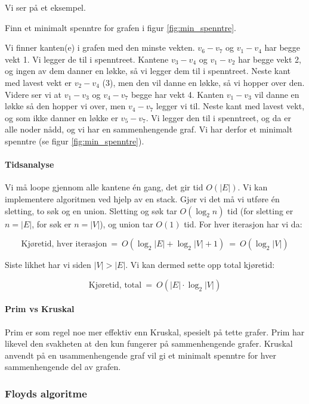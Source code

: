 \noindent Vi ser på et eksempel.

\begin{example} Finn et minimalt spenntre for grafen i figur \ref{fig:min_spenntre}.

Vi finner kanten(e) i grafen med den minste vekten. $ v_6-v_7 $ og $ v_1-v_4 $ har begge vekt 1. Vi legger de til i spenntreet. Kantene $ v_3-v_4 $ og $ v_1-v_2 $ har begge vekt 2, og ingen av dem danner en løkke, så vi legger dem til i spenntreet. Neste kant med lavest vekt er $ v_2-v_4 $ (3), men den vil danne en løkke, så vi hopper over den. Videre ser vi at $ v_1-v_3 $ og $ v_4-v_7 $ begge har vekt 4. Kanten $ v_1-v_3 $ vil danne en løkke så den hopper vi over, men $ v_4-v_7 $ legger vi til. Neste kant med lavest vekt, og som ikke danner en løkke er $ v_5-v_7 $. Vi legger den til i spenntreet, og da er alle noder nådd, og vi har en sammenhengende graf. Vi har derfor et minimalt spenntre (se figur \ref{fig:min_spenntre}). 
\end{example}


\paragraph{Tidsanalyse}
Vi må loope gjennom alle kantene én gang, det gir tid $ O(|E|) $. Vi kan implementere algoritmen ved hjelp av en stack. Gjør vi det må vi utføre én sletting, to søk og en union. Sletting og søk tar $ O(\log_2 n) $ tid (for sletting er $ n = |E| $, for søk er $ n = |V| $), og union tar $ O(1) $ tid. For hver iterasjon har vi da:

\[ \text{Kjøretid, hver iterasjon} ~=~ O(\log_2 |E| + \log_2 |V| + 1) ~=~ O(\log_2 |V|) \]

\noindent Siste likhet har vi siden $ |V| > |E| $. Vi kan dermed sette opp total kjøretid:

\[ \text{Kjøretid, total} ~=~ O(|E| \cdot \log_2 |V|) \]



\paragraph{Prim vs Kruskal}
Prim er som regel noe mer effektiv enn Kruskal, spesielt på tette grafer. Prim har likevel den svakheten at den kun fungerer på sammenhengende grafer. Kruskal anvendt på en usammenhengende graf vil gi et minimalt spenntre for hver sammenhengende del av grafen.


\subsubsection{Floyds algoritme}
\label{floyd}

